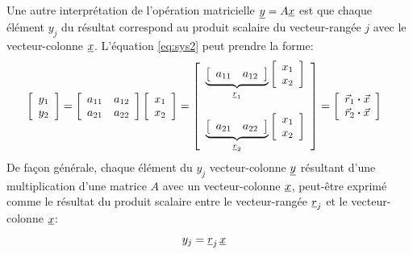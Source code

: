 Une autre interprétation de l'opération matricielle $\underline{y} = A \underline{x}$ est que chaque élément $y_j$ du résultat correspond au produit scalaire du vecteur-rangée $j$ avec le vecteur-colonne $\underline{x}$. L'équation \eqref{eq:sys2} peut prendre la forme:
%
\begin{align}
	\left[ \begin{array}{c}
			   y_1 \\ y_2
	\end{array} \right] &=
	\left[ \begin{array}{c c}
			   a_{11} & a_{12} \\ a_{21} & a_{22}
	\end{array} \right]
	\left[ \begin{array}{c}
			   x_1 \\ x_2
	\end{array} \right] =
	\left[ \begin{array}{c}
			   \underbrace{
				   \left[ \begin{array}{c c}
							  a_{11} & a_{12}
				   \end{array} \right]
			   }_{\underline{r}_1}
			   \left[ \begin{array}{c}
						  x_1 \\ x_2
			   \end{array} \right]
			   \\ \\
			   \underbrace{
				   \left[ \begin{array}{c c}
							  a_{21} & a_{22}
				   \end{array} \right]
			   }_{\underline{r}_2}
			   \left[ \begin{array}{c}
						  x_1 \\ x_2
			   \end{array} \right]
	\end{array} \right]
	=
	\left[ \begin{array}{c}
			   \vec{r}_1 \boldsymbol{\cdot} \vec{x}
			   \\
			   \vec{r}_2 \boldsymbol{\cdot} \vec{x}
	\end{array} \right]
\end{align}
%
De façon générale, chaque élément du $y_j$ vecteur-colonne $\underline{y}$ résultant d'une multiplication d'une matrice $A$ avec un vecteur-colonne $\underline{x}$, peut-être exprimé comme le résultat du produit scalaire entre le vecteur-rangée $\underline{r}_j$ et le vecteur-colonne $\underline{x}$:
%
\begin{align}
	y_j
	&= \underline{r}_j \, \underline{x}
\end{align}
%


